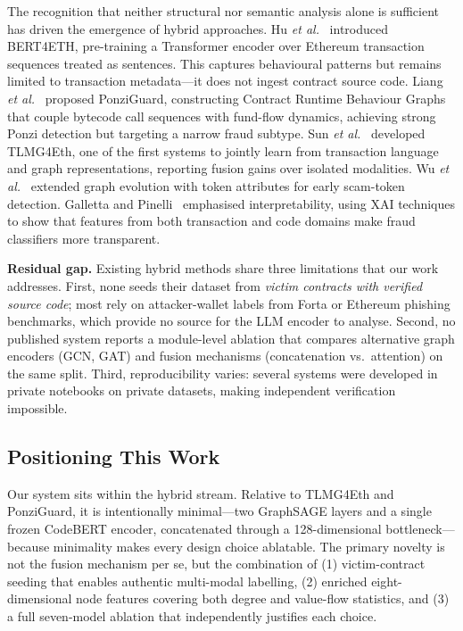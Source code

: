 The recognition that neither structural nor semantic analysis alone is
sufficient has driven the emergence of hybrid approaches.
Hu \emph{et al.}~\cite{hu2023bert4eth} introduced BERT4ETH, pre-training
a Transformer encoder over Ethereum transaction sequences treated as
sentences.  This captures behavioural patterns but remains limited to
transaction metadata---it does not ingest contract source code.
Liang \emph{et al.}~\cite{liang2025ponziguard} proposed PonziGuard,
constructing Contract Runtime Behaviour Graphs that couple bytecode
call sequences with fund-flow dynamics, achieving strong Ponzi detection
but targeting a narrow fraud subtype.
Sun \emph{et al.}~\cite{sun2025tlmg4eth} developed TLMG4Eth, one of
the first systems to jointly learn from transaction language and graph
representations, reporting fusion gains over isolated modalities.
Wu \emph{et al.}~\cite{wu2024tokenscout} extended graph evolution with
token attributes for early scam-token detection.
Galletta and Pinelli~\cite{galletta2024ponzi} emphasised
interpretability, using XAI techniques to show that features from both
transaction and code domains make fraud classifiers more transparent.

\textbf{Residual gap.}
Existing hybrid methods share three limitations that our work addresses.
First, none seeds their dataset from \emph{victim contracts with verified
source code}; most rely on attacker-wallet labels from Forta or
Ethereum phishing benchmarks, which provide no source for the LLM
encoder to analyse.
Second, no published system reports a module-level ablation that
compares alternative graph encoders (GCN, GAT) and fusion mechanisms
(concatenation vs.\ attention) on the same split.
Third, reproducibility varies: several systems were developed in private
notebooks on private datasets, making independent verification impossible.

\subsection{Positioning This Work}

Our system sits within the hybrid stream.  Relative to TLMG4Eth and
PonziGuard, it is intentionally minimal---two GraphSAGE layers and a
single frozen CodeBERT encoder, concatenated through a 128-dimensional
bottleneck---because minimality makes every design choice ablatable.
The primary novelty is not the fusion mechanism per se, but the
combination of (1) victim-contract seeding that enables authentic
multi-modal labelling, (2) enriched eight-dimensional node features
covering both degree and value-flow statistics, and (3) a full
seven-model ablation that independently justifies each choice.
